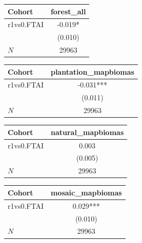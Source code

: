 {
\def\sym#1{\ifmmode^{#1}\else\(^{#1}\)\fi}
\begin{tabular}{l*{1}{c}}
\toprule
Cohort    &forest\_all   \\
\midrule
r1vs0.FTAI&   -0.019*  \\
          &  (0.010)   \\
\midrule
\(N\)     &    29963   \\
\bottomrule
\end{tabular}
}
{
\def\sym#1{\ifmmode^{#1}\else\(^{#1}\)\fi}
\begin{tabular}{l*{1}{c}}
\toprule
Cohort    &plantation\_mapbiomas   \\
\midrule
r1vs0.FTAI&   -0.031***\\
          &  (0.011)   \\
\midrule
\(N\)     &    29963   \\
\bottomrule
\end{tabular}
}
{
\def\sym#1{\ifmmode^{#1}\else\(^{#1}\)\fi}
\begin{tabular}{l*{1}{c}}
\toprule
Cohort    &natural\_mapbiomas   \\
\midrule
r1vs0.FTAI&    0.003   \\
          &  (0.005)   \\
\midrule
\(N\)     &    29963   \\
\bottomrule
\end{tabular}
}
{
\def\sym#1{\ifmmode^{#1}\else\(^{#1}\)\fi}
\begin{tabular}{l*{1}{c}}
\toprule
Cohort    &mosaic\_mapbiomas   \\
\midrule
r1vs0.FTAI&    0.029***\\
          &  (0.010)   \\
\midrule
\(N\)     &    29963   \\
\bottomrule
\end{tabular}
}
